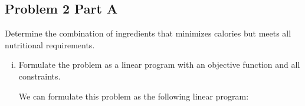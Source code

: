 \documentclass[../main.tex]{subfiles}
\begin{document}
\subsection*{Problem 2 Part A}
Determine the combination of ingredients that minimizes calories but meets all nutritional requirements.

\begin{enumerate}[i.]
	\item Formulate the problem as a linear program with an objective function and all constraints.

	We can formulate this problem as the following linear program:


\end{enumerate}
\end{document}
